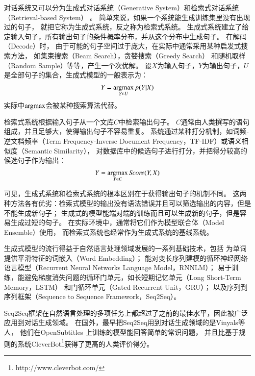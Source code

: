 对话系统又可以分为生成式对话系统（Generative System）和检索式对话系统（Retrieval-based System）
。
简单来说，如果一个系统能生成训练集里没有出现过的句子，
就把它称为生成式系统，反之称为检索式系统。
生成式系统建立了给定输入句子，所有输出句子的条件概率分布，并从这个分布中生成句子。
在解码（Decode）时，
由于可能的句子空间过于庞大，在实际中通常采用某种启发式搜索方法，
如集束搜索（Beam Search），贪婪搜索（Greedy Search）
和随机取样（Random Sample）等等，产生一个次优解。
设$X$为输入句子，$Y$为输出句子，$U$是全部句子的集合，生成式模型的一般表示为：
\begin{align}
    Y = \operatorname*{argmax}_{Y\in U} p(Y|X)
\end{align}
实际中$\operatorname*{argmax}$会被某种搜索算法代替。

检索式系统根据输入句子从一个文库$C$中检索输出句子。
$C$通常由人类撰写的语句组成，并且足够大，使得输出句子不容易重复。
系统通过某种打分机制，如词频-逆文档频率（Term Frequency-Inverse Document Frequency，TF-IDF）或语义相似度（Semantic Similarity），
对数据库中的候选句子进行打分，并把得分较高的候选句子作为输出：
\begin{align}
    Y = \operatorname*{argmax}_{Y\in C} \textit{Score}(Y, X)
\end{align}

可见，生成式系统和检索式系统的根本区别在于获得输出句子的机制不同。
这两种方法各有优劣：检索式模型的输出没有语法错误并且可以筛选输出的内容，但是不能生成新句子；
生成式的模型能端对端的训练而且可以生成新的句子，但是容易生成过短的句子。
在实际环境中，通常将它们作为模型联合体（Model Ensemble）使用，
而检索式系统也经常作为生成式系统的基线系统。

生成式模型的流行得益于自然语言处理领域发展的一系列基础技术，包括
为单词提供平滑特征的词嵌入（Word Embedding）；
能对变长序列建模的循环神经网络语言模型（Recurrent Neural Networks Language Model，RNNLM）；
易于训练，能避免梯度消失问题的循环门单元，如长短期记忆单元（Long Short-Term Memory，LSTM）
和门循环单元（Gated Recurrent Unit，GRU）；
以及序列到序列框架（Sequence to Sequence Framework，Seq2Seq）。

Seq2Seq框架在自然语言处理的多项任务上都超过了之前的最佳水平，因此被广泛应用到对话生成领域。
在国外，最早把Seq2Seq用到对话生成领域的是Vinyals等人，
他们在OpenSubtitles
上训练的模型能回答简单的常识问题，
并且比基于规则的系统CleverBot\footnote{http://www.cleverbot.com/}获得了更高的人类评价得分。

